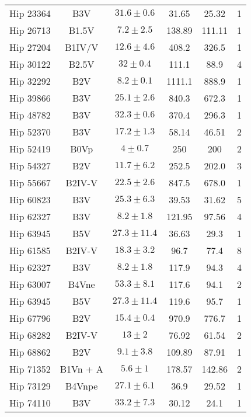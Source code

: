 \documentclass[11pt]{report}     %
\begin{document}
\begin{center}
\begin{small}
\begin{longtable}[h]{|cccccc|}
        Hip 23364 & B3V &$ 31.6 \pm 0.6 $& 31.65 & 25.32 & 1 \\ 
        Hip 26713 & B1.5V &$ 7.2 \pm 2.5 $& 138.89 & 111.11 & 1 \\ 
        Hip 27204 & B1IV/V & $12.6 \pm 4.6$ & 408.2 & 326.5 & 1 \\
	Hip 30122 & B2.5V & $32 \pm 0.4$ & 111.1 & 88.9 & 4 \\
	Hip 32292 & B2V & $8.2 \pm 0.1$ & 1111.1 & 888.9 & 1 \\
	Hip 39866 & B3V & $25.1 \pm 2.6$ & 840.3 & 672.3 & 1 \\
	Hip 48782 & B3V & $32.3 \pm 0.6$ & 370.4 & 296.3 & 1 \\
        Hip 52370 & B3V &$ 17.2 \pm 1.3 $& 58.14 & 46.51 & 2 \\ 
        Hip 52419 & B0Vp &$ 4 \pm 0.7 $& 250 & 200 & 2 \\ 
	Hip 54327 & B2V & $11.7 \pm 6.2$ & 252.5 & 202.0 & 3 \\
	Hip 55667 & B2IV-V & $22.5 \pm 2.6$ & 847.5 & 678.0 & 1 \\
        Hip 60823 & B3V	&$ 25.3 \pm 6.3 $& 39.53 & 31.62 & 5 \\ 
        Hip 62327 & B3V &$ 8.2 \pm 1.8 $& 121.95 & 97.56 & 4 \\
        Hip 63945 & B5V &$ 27.3 \pm 11.4 $& 36.63 & 29.3 & 1 \\  
   	Hip 61585 & B2IV-V & $18.3 \pm 3.2$ & 96.7 & 77.4 & 8 \\
   	Hip 62327 & B3V & $8.2 \pm 1.8$ & 117.9 & 94.3 & 4 \\
	Hip 63007 & B4Vne & $53.3 \pm 8.1$ & 117.6 & 94.1 & 2 \\
	Hip 63945 & B5V & $27.3 \pm 11.4$ & 119.6 & 95.7 & 1 \\
	Hip 67796 & B2V	& $15.4 \pm 0.4$ & 970.9 & 776.7 & 1 \\
        Hip 68282 & B2IV-V &$ 13 \pm 2 $& 76.92 & 61.54 & 2\\ 
        Hip 68862 & B2V &$ 9.1 \pm 3.8 $& 109.89 & 87.91 & 1 \\ 
        Hip 71352 & B1Vn + A &$ 5.6 \pm 1 $& 178.57 & 142.86 & 2 \\ 
        Hip 73129 & B4Vnpe &$ 27.1 \pm 6.1 $& 36.9 & 29.52 & 1 \\ 
        Hip 74110 & B3V &$ 33.2 \pm 7.3 $& 30.12 & 24.1 & 1 \\ 

\end{longtable}
\end{small}
\end{center}
\end{document}
